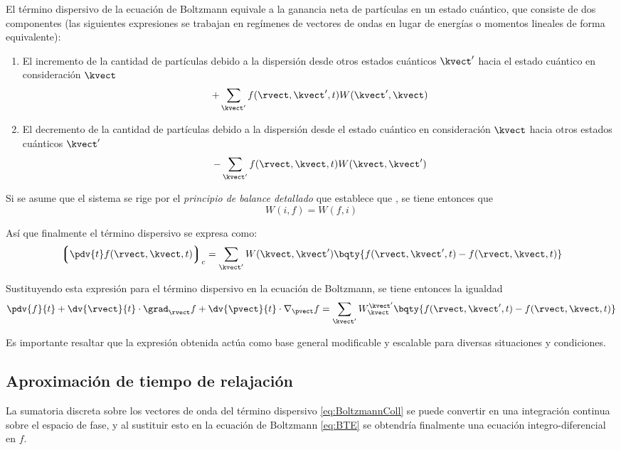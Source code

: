 El término dispersivo de la ecuación de Boltzmann equivale a la ganancia neta de partículas en un estado cuántico, que consiste de dos componentes (las siguientes expresiones se trabajan en regímenes de vectores de ondas en lugar de energías o momentos lineales de forma equivalente):
\begin{enumerate}
	\item El incremento de la cantidad de partículas debido a la dispersión desde otros estados cuánticos $ \kvect' $ hacia el estado cuántico en consideración $ \kvect $ \[ + \sum_{\kvect'} f(\rvect, \kvect', t) W(\kvect',\kvect) \]
	\item El decremento de la cantidad de partículas debido a la dispersión desde el estado cuántico en consideración $ \kvect $ hacia otros estados cuánticos $ \kvect' $ \[ - \sum_{\kvect'} f(\rvect, \kvect, t) W(\kvect,\kvect') \]
\end{enumerate}

Si se asume que el sistema se rige por el \emph{principio de balance detallado} que establece que , se tiene entonces que \[ W(i, f) = W(f, i) \]

Así que finalmente el término dispersivo se expresa como:
\begin{equation}\label{eq:BoltzmannColl}
\left\lgroup\pdv{t} f(\rvect, \kvect, t) \right\rgroup_{c} = \sum_{\kvect'} W(\kvect, \kvect') \bqty{ f(\rvect, \kvect', t) - f(\rvect, \kvect, t) }
\end{equation}

Sustituyendo esta expresión para el término dispersivo en la ecuación de Boltzmann, se tiene entonces la igualdad
\begin{equation}\label{eq:BTEexp}
\pdv{f}{t} + \dv{\rvect}{t} \cdot \grad_{\rvect}{f} + \dv{\pvect}{t} \cdot \nabla_{\pvect}{f} = \sum_{\kvect'} W_{\kvect}^{\kvect'} \bqty{ f(\rvect, \kvect', t) - f(\rvect, \kvect, t) }
\end{equation}

Es importante resaltar que la expresión obtenida actúa como base general modificable y escalable para diversas situaciones y condiciones.

\subsection{Aproximación de tiempo de relajación}

La sumatoria discreta sobre los vectores de onda del término dispersivo \eqref{eq:BoltzmannColl} se puede convertir en una integración continua sobre el espacio de fase, y al sustituir esto en la ecuación de Boltzmann \eqref{eq:BTE} se obtendría finalmente una ecuación integro-diferencial en $ f $.


